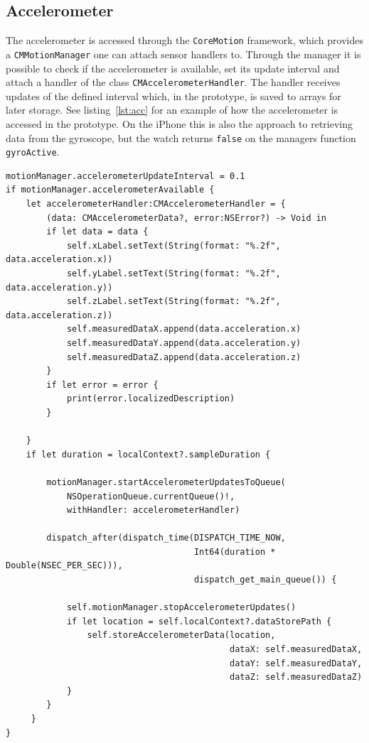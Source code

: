 \subsection{Accelerometer}
The accelerometer is accessed through the \texttt{CoreMotion} framework, which
provides a \texttt{CMMotionManager} one can attach sensor handlers to. Through
the manager it is possible to check if the accelerometer is available, set its 
update interval and attach a handler of the class
\texttt{CMAccelerometerHandler}. The handler receives updates of the defined
interval which, in the prototype, is saved to arrays for later storage. See
listing~\ref{lst:acc} for an example of how the accelerometer is accessed in the
prototype.
On the iPhone this is also the approach to retrieving data from the gyroscope,
but the watch returns \texttt{false} on the managers function
\texttt{gyroActive}. 

\begin{lstlisting}[label={lst:acc},caption={Usage of accelerometer in prototype.
The accelerometerHandler is attached to the motionManager in order to receive
updates on the set interval of 0.1.},basicstyle=\small]
motionManager.accelerometerUpdateInterval = 0.1
if motionManager.accelerometerAvailable {
    let accelerometerHandler:CMAccelerometerHandler = {
        (data: CMAccelerometerData?, error:NSError?) -> Void in
        if let data = data {
            self.xLabel.setText(String(format: "%.2f", data.acceleration.x))
            self.yLabel.setText(String(format: "%.2f", data.acceleration.y))
            self.zLabel.setText(String(format: "%.2f", data.acceleration.z))
            self.measuredDataX.append(data.acceleration.x)
            self.measuredDataY.append(data.acceleration.y)
            self.measuredDataZ.append(data.acceleration.z)
        }
        if let error = error {
            print(error.localizedDescription)
        }
        
    }
    if let duration = localContext?.sampleDuration {

        motionManager.startAccelerometerUpdatesToQueue(
            NSOperationQueue.currentQueue()!, 
            withHandler: accelerometerHandler)

        dispatch_after(dispatch_time(DISPATCH_TIME_NOW, 
                                     Int64(duration * Double(NSEC_PER_SEC))), 
                                     dispatch_get_main_queue()) {

            self.motionManager.stopAccelerometerUpdates()
            if let location = self.localContext?.dataStorePath {
                self.storeAccelerometerData(location,
                                            dataX: self.measuredDataX,
                                            dataY: self.measuredDataY,
                                            dataZ: self.measuredDataZ)
            }
        }
     }
}
\end{lstlisting}

